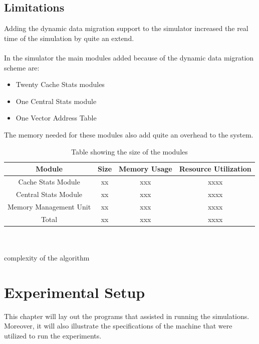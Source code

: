 \documentclass{listhesis}
\begin{document}
\section{Limitations}
Adding the dynamic data migration support to the simulator increased the real time of the simulation by quite an extend. \\
\\
In the simulator the main modules added because of the dynamic data migration scheme are:
\begin{itemize}
  \item Twenty Cache Stats modules
  \item One Central Stats module 
  \item One Vector Address Table
\end{itemize}
The memory needed for these modules also add quite an overhead to the system. 
\begin{table}[h!]
\begin{center}
 \begin{tabular}{||c c c c||} 
 \hline
 Module & Size & Memory Usage   & Resource Utilization \\ [0.5 ex] 
 \hline\hline
 Cache Stats Module & xx & xxx & xxxx \\ 
 \hline
 Central Stats Module & xx & xxx & xxxx \\
 \hline
 Memory Management Unit & xx & xxx & xxxx \\
 \hline\hline
 Total  & xx & xxx & xxxx \\
  \hline
\end{tabular}
 \caption{Table showing the size of the modules}
 \label{fig:modules}
\end{center}
\end{table}
\\
\\
complexity of the algorithm
\chapter{Experimental Setup}
This chapter will lay out the programs that assisted in running the simulations. Moreover, it will also illustrate the specifications of the machine that were utilized to run the experiments.
\end{document}
